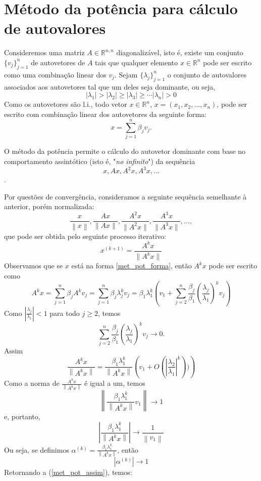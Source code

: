 \section{Método da potência para cálculo de autovalores}
Consideremos uma matriz $A\in \mathbb{R}^{n,n}$ diagonalizável, isto é, existe um conjunto $\{v_{j}\}_{j=1}^n$ de autovetores de $A$ tais que qualquer elemento $x\in\mathbb{R}^n$ pode ser escrito como uma combinação linear dos $v_{j}$. Sejam $\{\lambda_j\}_{j=1}^n$ o conjunto de autovalores associados aos autovetores tal que um deles seja dominante, ou seja,
$$
|\lambda_1|>|\lambda_2|\geq |\lambda_3|\geq\cdots |\lambda_n|>0
$$
Como os autovetores são l.i., todo vetor $x\in\mathbb{R}^n$, $x=(x_1,x_2,...,x_n)$, pode ser escrito com combinação linear dos autovetores da seguinte forma:
\begin{equation}\label{met_pot_forma}
x=\sum_{j=1}^n\beta_jv_{j}.
\end{equation}

O método da potência permite o cálculo do autovetor dominante com base no comportamento assintótico (isto é, "{\it no infinito}") da sequência
$$x, Ax, A^2x, A^3x, \ldots$$.

Por questões de convergência, consideramos a seguinte sequência semelhante à anterior, porém normalizada:
$$\frac{x}{\left\|x\right\|}, \frac{Ax}{\|Ax\|}, \frac{A^2x}{\|A^2x\|}, \frac{A^3x}{\|A^3x\|}, \ldots,$$
que pode ser obtida pelo seguinte processo iterativo:
$$x^{(k+1)}=\frac{A^{k}x}{\|A^{k}x\|}$$
Observamos que se $x$ está na forma \eqref{met_pot_forma}, então $A^k x$ pode ser escrito como
$$A^{k} x = \sum_{j=1}^n\beta_j A^k v_{j}=\sum_{j=1}^n\beta_j \lambda_j^k v_{j}= \beta_1\lambda_1^k\left(v_1+\sum_{j=2}^n\frac{\beta_j}{\beta_1} \left(\frac{\lambda_j}{\lambda_1}\right)^k v_{j}\right)$$
Como $\left|\frac{\lambda_j}{\lambda_1}\right|<1$ para todo $j\geq 2$, temos
$$\sum_{j=2}^n\frac{\beta_j}{\beta_1} \left(\frac{\lambda_j}{\lambda_1}\right)^k v_{j} \to 0.$$
Assim
\begin{equation}\label{met_pot_assim}
  \frac{A^k x}{\left\|A^k x\right\|} = \frac{\beta_1\lambda_1^k}{\left\|A^k x\right\|}\left( v_1 + O\left(\left|\frac{\lambda_2}{\lambda_1}\right|^k\right))\right) 
\end{equation}
Como a norma de $\frac{A^k x}{\left\|A^k x\right\|}$ é igual a um, temos
$$\left\|\frac{\beta_1\lambda_1^k}{\left\|A^k x\right\|}v_1\right\| \to 1$$
e, portanto,
$$\left|\frac{\beta_1\lambda_1^k}{\left\|A^k x\right\|}\right| \to \frac{1}{\left\|v_1\right\|}$$
Ou seja, se definimos $\alpha^{(k)}=\frac{\beta_1\lambda_1^k}{\left\|A^k x\right\|}$, então
$$
|\alpha^{(k)}|\to 1
$$
Retornando a (\ref{met_pot_assim}), temos:

